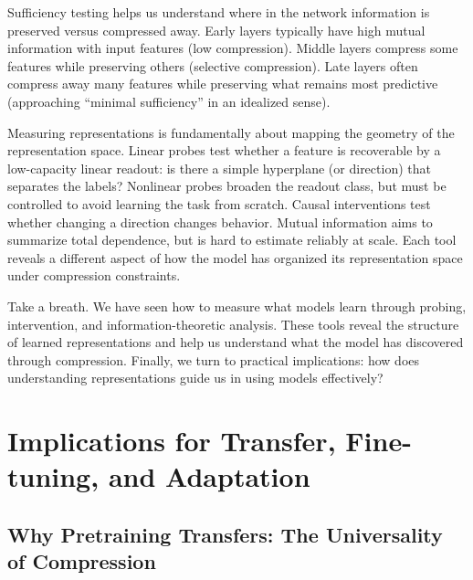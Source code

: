 \vspace{1em}

Sufficiency testing helps us understand where in the network information is preserved versus compressed away. Early layers typically have high mutual information with input features (low compression). Middle layers compress some features while preserving others (selective compression). Late layers often compress away many features while preserving what remains most predictive (approaching ``minimal sufficiency'' in an idealized sense).

\vspace{1.5em}

\begin{geometrylens}
Measuring representations is fundamentally about mapping the geometry of the representation space. Linear probes test whether a feature is recoverable by a low-capacity linear readout: is there a simple hyperplane (or direction) that separates the labels? Nonlinear probes broaden the readout class, but must be controlled to avoid learning the task from scratch. Causal interventions test whether changing a direction changes behavior. Mutual information aims to summarize total dependence, but is hard to estimate reliably at scale. Each tool reveals a different aspect of how the model has organized its representation space under compression constraints.
\end{geometrylens}

\vspace{2em}

Take a breath. We have seen how to measure what models learn through probing, intervention, and information-theoretic analysis. These tools reveal the structure of learned representations and help us understand what the model has discovered through compression. Finally, we turn to practical implications: how does understanding representations guide us in using models effectively?

\vspace{2em}

\section{Implications for Transfer, Fine-tuning, and Adaptation}
\label{sec:practical_implications}

\vspace{1em}

\subsection{Why Pretraining Transfers: The Universality of Compression}

